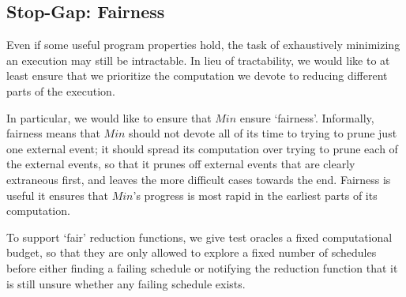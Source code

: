  

\subsection{Stop-Gap: Fairness}

Even if some useful program properties hold, the task of exhaustively
minimizing an execution may still be intractable. In lieu of tractability, we
would like to at least ensure that we prioritize the computation we devote to
reducing different parts of the execution.

In particular, we would like to ensure that $Min$ ensure `fairness'. Informally,
fairness means that
$Min$ should not devote all of its time to trying to prune just one
external event; it should spread its computation over trying to prune each
of the external events, so that it prunes off external events that are clearly
extraneous first, and leaves the more difficult cases towards the end.
Fairness is useful it ensures that $Min$'s progress is most rapid in the
earliest parts of its computation.

To support `fair' reduction functions, we give test oracles a fixed
computational budget, so that they are only allowed to explore a fixed
number of schedules before either finding a failing schedule or notifying the
reduction function that it is still unsure whether any failing schedule
exists.


